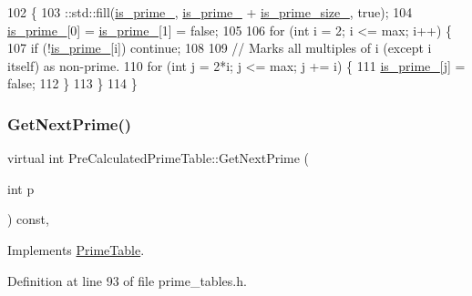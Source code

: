 \begin{DoxyCode}
102                                     \{
103     ::std::fill(\hyperlink{classPreCalculatedPrimeTable_ac393ebf41a32b3cba39fe67f7aa5fa38}{is\_prime\_}, \hyperlink{classPreCalculatedPrimeTable_ac393ebf41a32b3cba39fe67f7aa5fa38}{is\_prime\_} + \hyperlink{classPreCalculatedPrimeTable_ad4275df41c5e5be3cad8c5abeaad1ac6}{is\_prime\_size\_}, \textcolor{keyword}{true});
104     \hyperlink{classPreCalculatedPrimeTable_ac393ebf41a32b3cba39fe67f7aa5fa38}{is\_prime\_}[0] = \hyperlink{classPreCalculatedPrimeTable_ac393ebf41a32b3cba39fe67f7aa5fa38}{is\_prime\_}[1] = \textcolor{keyword}{false};
105 
106     \textcolor{keywordflow}{for} (\textcolor{keywordtype}{int} i = 2; i <= max; i++) \{
107       \textcolor{keywordflow}{if} (!\hyperlink{classPreCalculatedPrimeTable_ac393ebf41a32b3cba39fe67f7aa5fa38}{is\_prime\_}[i]) \textcolor{keywordflow}{continue};
108 
109       \textcolor{comment}{// Marks all multiples of i (except i itself) as non-prime.}
110       \textcolor{keywordflow}{for} (\textcolor{keywordtype}{int} j = 2*i; j <= max; j += i) \{
111         \hyperlink{classPreCalculatedPrimeTable_ac393ebf41a32b3cba39fe67f7aa5fa38}{is\_prime\_}[j] = \textcolor{keyword}{false};
112       \}
113     \}
114   \}
\end{DoxyCode}
\mbox{\label{classPreCalculatedPrimeTable_a0ff10b1fe13df7e56b8d7ed9f41d3998}} 
\subsubsection{\texorpdfstring{Get\+Next\+Prime()}{GetNextPrime()}}
{\footnotesize\ttfamily virtual int Pre\+Calculated\+Prime\+Table\+::\+Get\+Next\+Prime (\begin{DoxyParamCaption}\item[{int}]{p }\end{DoxyParamCaption}) const\hspace{0.3cm}{\ttfamily [inline]}, {\ttfamily [virtual]}}



Implements \hyperlink{classPrimeTable_ae537c939f56617d8937d57bbbae3ab30}{Prime\+Table}.



Definition at line 93 of file prime\+\_\+tables.\+h.


